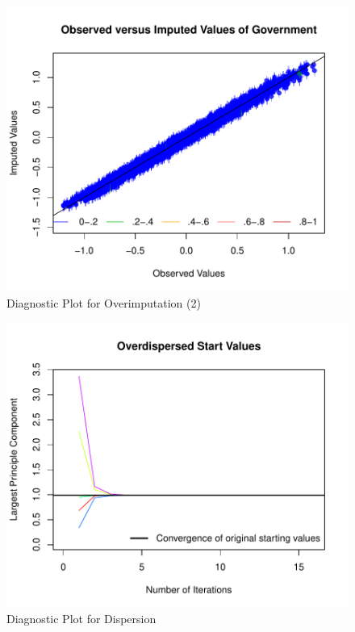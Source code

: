 \documentclass[12pt,]{article}
\begin{document}
\begin{figure}[htbp]
\centering
\includegraphics{figures/missing5-1.pdf}
\caption{Diagnostic Plot for Overimputation (2)}
\end{figure}

\clearpage

\begin{figure}[htbp]
\centering
\includegraphics{figures/missing6-1.pdf}
\caption{Diagnostic Plot for Dispersion}
\end{figure}
\end{document}
